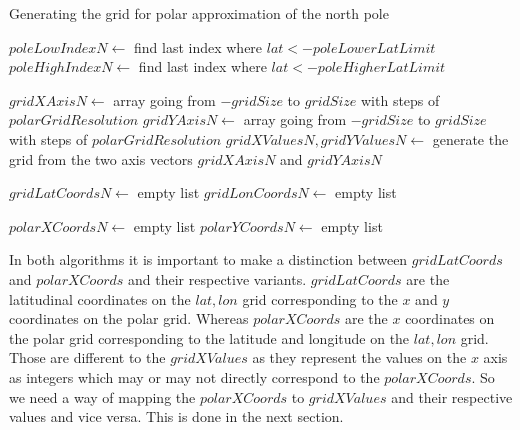\begin{algorithm}[htb]
    \caption{Generating the grid for polar approximation of the north pole}
    \label{alg:polar grid north}
    $poleLowIndexN \leftarrow $ find last index where $lat < -poleLowerLatLimit$ \;
    $poleHighIndexN \leftarrow $ find last index where $lat < -poleHigherLatLimit$ \;
    \BlankLine

    $gridXAxisN \leftarrow $ array going from $-gridSize$ to $gridSize$ with steps of $polarGridResolution$ \;
    $gridYAxisN \leftarrow $ array going from $-gridSize$ to $gridSize$ with steps of $polarGridResolution$ \;
    $gridXValuesN, gridYValuesN \leftarrow $ generate the grid from the two axis vectors $gridXAxisN$ and $gridYAxisN$ \;
    \BlankLine 
    
    $gridLatCoordsN \leftarrow $ empty list \;
    $gridLonCoordsN \leftarrow $ empty list \;

    \BlankLine
    $polarXCoordsN \leftarrow$ empty list \;
    $polarYCoordsN \leftarrow$ empty list \;
\end{algorithm}

In both algorithms it is important to make a distinction between $gridLatCoords$ and $polarXCoords$ and their respective variants. $gridLatCoords$ are the latitudinal coordinates on the 
$lat, lon$ grid corresponding to the $x$ and $y$ coordinates on the polar grid. Whereas $polarXCoords$ are the $x$ coordinates on the polar grid corresponding to the latitude and longitude on 
the $lat, lon$ grid. Those are different to the $gridXValues$ as they represent the values on the $x$ axis as integers which may or may not directly correspond to the $polarXCoords$. So we need 
a way of mapping the $polarXCoords$ to $gridXValues$ and their respective values and vice versa. This is done in the next section.


